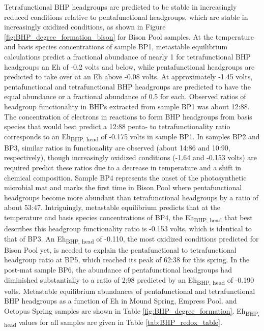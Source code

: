 Tetrafunctional BHP headgroups are predicted to be stable in increasingly reduced conditions relative to pentafunctional headgroups, which are stable in increasingly oxidized conditions, as shown in Figure \ref{fig:BHP_degree_formation_bison} for Bison Pool samples. At the temperature and basis species concentrations of sample BP1, metastable equilibrium calculations predict a fractional abundance of nearly 1 for tetrafunctional BHP headgroups an Eh of -0.2 volts and below, while pentafunctional headgroups are predicted to take over at an Eh above -0.08 volts. At approximately -1.45 volts, pentafunctional and tetrafunctional BHP headgroups are predicted to have the equal abundance or a fractional abundance of 0.5 for each. Observed ratios of headgroup functionality in BHPs extracted from sample BP1 was about 12:88. The concentration of electrons in reactions to form BHP headgroups from basis species that would best predict a 12:88 penta- to tetrafunctionality ratio corresponds to an Eh\textsubscript{BHP, head} of -0.175 volts in sample BP1. In samples BP2 and BP3, similar ratios in functionality are observed (about 14:86 and 10:90, respectively), though increasingly oxidized conditions (-1.64 and -0.153 volts) are required predict these ratios due to a decrease in temperature and a shift in chemical composition. Sample BP4 represents the onset of the photosynthetic microbial mat and marks the first time in Bison Pool where pentafunctional headgroups become more abundant than tetrafunctional headgroups by a ratio of about 53:47. Intriguingly, metastable equilibrium predicts that at the temperature and basis species concentrations of BP4, the Eh\textsubscript{BHP, head} that best describes this headgroup functionality ratio is -0.153 volts, which is identical to that of BP3. An Eh\textsubscript{BHP, head} of -0.110, the most oxidized conditions predicted for Bison Pool yet, is needed to explain the pentafunctional to tetrafunctional headgroup ratio at BP5, which reached its peak of 62:38 for this spring. In the post-mat sample BP6, the abundance of pentafunctional headgroups had diminished substantially to a ratio of 2:98 predicted by an Eh\textsubscript{BHP, head} of -0.190 volts. Metastable equilibrium abundances of pentafunctional and tetrafunctional BHP headgroups as a function of Eh in Mound Spring, Empress Pool, and Octopus Spring samples are shown in Table \ref{fig:BHP_degree_formation}. Eh\textsubscript{BHP, head} values for all samples are given in Table \ref{tab:BHP_redox_table}.

